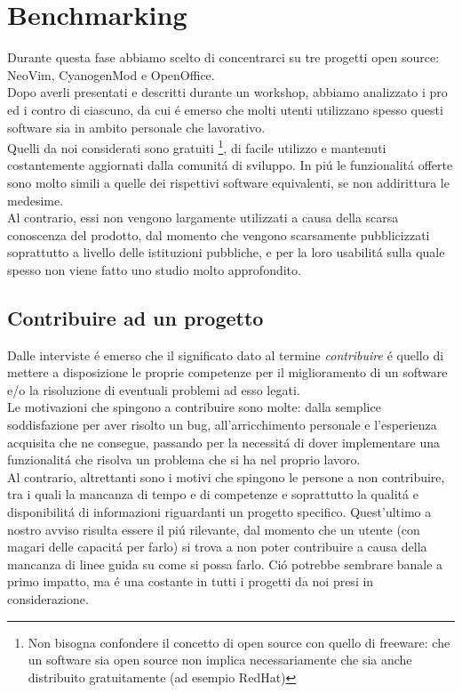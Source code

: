\documentclass[12pt]{article} %
\begin{document}
\section{Benchmarking}
Durante questa fase abbiamo scelto di concentrarci su tre progetti open source: NeoVim, CyanogenMod e OpenOffice.\\
Dopo averli presentati e descritti durante un workshop, abbiamo analizzato i pro ed i contro di ciascuno, da cui \'e emerso che molti utenti utilizzano spesso questi software sia in ambito personale che lavorativo.\\
Quelli da noi considerati sono gratuiti \footnote{Non bisogna confondere il concetto di open source con quello di freeware: che un software sia open source non implica necessariamente che sia anche distribuito gratuitamente (ad esempio RedHat)}, di facile utilizzo e mantenuti costantemente aggiornati dalla comunit\'a di sviluppo. In pi\'u le funzionalit\'a offerte sono molto simili a quelle dei rispettivi software equivalenti, se non addirittura le medesime.\\
Al contrario, essi non vengono largamente utilizzati a causa della scarsa conoscenza del prodotto, dal momento che vengono scarsamente pubblicizzati soprattutto a livello delle istituzioni pubbliche, e per la loro usabilit\'a sulla quale spesso non viene fatto uno studio molto approfondito.\\
\subsection{Contribuire ad un progetto}
\label{motivi}
Dalle interviste \'e emerso che il significato dato al termine \emph{contribuire} \'e quello di mettere a disposizione le proprie competenze per il miglioramento di un software e/o la risoluzione di eventuali problemi ad esso legati.\\
Le motivazioni che spingono a contribuire sono molte: dalla semplice soddisfazione per aver risolto un bug, all'arricchimento personale e l'esperienza acquisita che ne consegue, passando per la necessit\'a di dover implementare una funzionalit\'a che risolva un problema che si ha nel proprio lavoro.\\
Al contrario, altrettanti sono i motivi che spingono le persone a non contribuire, tra i quali la mancanza di tempo e di competenze e soprattutto la qualit\'a e disponibilit\'a di informazioni riguardanti un progetto specifico. Quest'ultimo a nostro avviso risulta essere il pi\'u rilevante, dal momento che un utente (con magari delle capacit\'a per farlo) si trova a non poter contribuire a causa della mancanza di linee guida su come si possa farlo.		 Ci\'o potrebbe sembrare banale a primo impatto, ma \'e una costante in tutti i progetti da noi presi in considerazione.
\newpage
\end{document}
